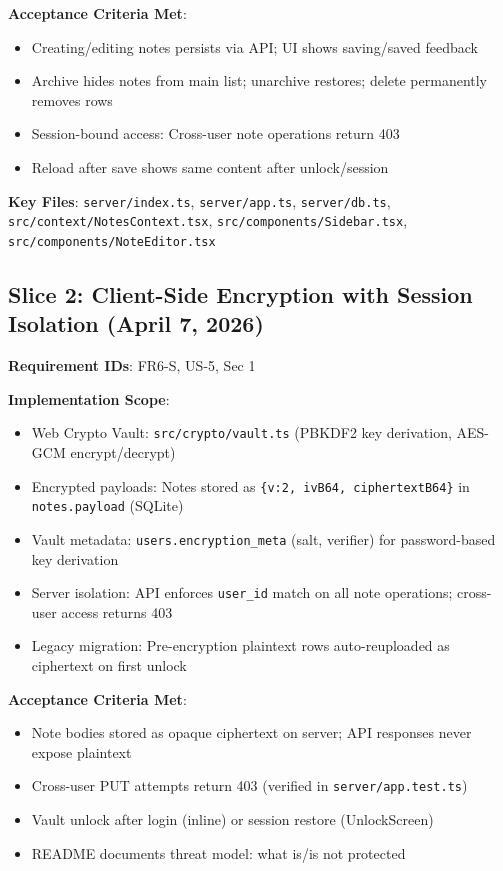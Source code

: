\documentclass[11pt,a4paper]{article}
\begin{document}
\textbf{Acceptance Criteria Met}:
\begin{itemize}
  \item[√] Creating/editing notes persists via API; UI shows saving/saved feedback
  \item[√] Archive hides notes from main list; unarchive restores; delete permanently removes rows
  \item[√] Session-bound access: Cross-user note operations return 403
  \item[√] Reload after save shows same content after unlock/session
\end{itemize}

\textbf{Key Files}:
\texttt{server/index.ts}, \texttt{server/app.ts}, \texttt{server/db.ts}, \texttt{src/context/NotesContext.tsx}, \texttt{src/components/Sidebar.tsx}, \texttt{src/components/NoteEditor.tsx}

\subsection{Slice 2: Client-Side Encryption with Session Isolation (April 7, 2026)}
\textbf{Requirement IDs}: FR6-S, US-5, Sec 1

\textbf{Implementation Scope}:
\begin{itemize}
  \item Web Crypto Vault: \texttt{src/crypto/vault.ts} (PBKDF2 key derivation, AES-GCM encrypt/decrypt)
  \item Encrypted payloads: Notes stored as \texttt{\{v:2, ivB64, ciphertextB64\}} in \texttt{notes.payload} (SQLite)
  \item Vault metadata: \texttt{users.encryption\_meta} (salt, verifier) for password-based key derivation
  \item Server isolation: API enforces \texttt{user\_id} match on all note operations; cross-user access returns 403
  \item Legacy migration: Pre-encryption plaintext rows auto-reuploaded as ciphertext on first unlock
\end{itemize}

\textbf{Acceptance Criteria Met}:
\begin{itemize}
  \item[√] Note bodies stored as opaque ciphertext on server; API responses never expose plaintext
  \item[√] Cross-user PUT attempts return 403 (verified in \texttt{server/app.test.ts})
  \item[√] Vault unlock after login (inline) or session restore (UnlockScreen)
  \item[√] README documents threat model: what is/is not protected
\end{itemize}
\end{document}

